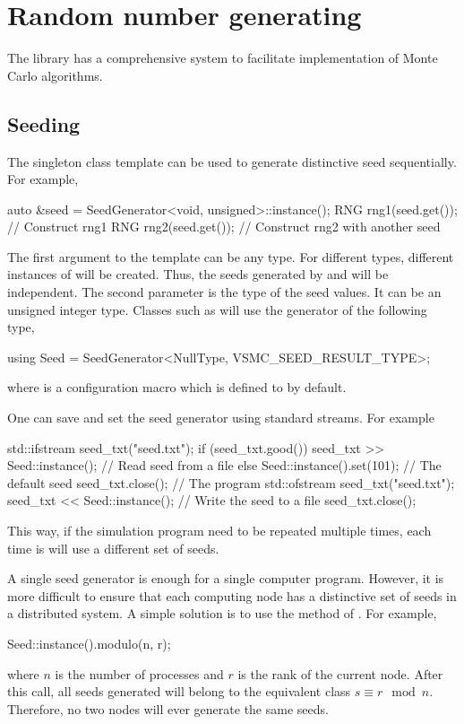 \section{Random number generating}
\label{sec:Random number generating}

The library has a comprehensive \rng system to facilitate implementation of
Monte Carlo algorithms.

\subsection{Seeding}
\label{sub:Seeding}

The singleton class template  can be used to generate
distinctive seed sequentially. For example,
\begin{cppcode}
  auto &seed = SeedGenerator<void, unsigned>::instance();
  RNG rng1(seed.get()); // Construct rng1
  RNG rng2(seed.get()); // Construct rng2 with another seed
\end{cppcode}
The first argument to the template can be any type. For different types,
different instances of  will be created. Thus, the
seeds generated by  and
 will be independent. The second parameter is the
type of the seed values. It can be an unsigned integer type. Classes such as
 will use the generator of the following type,
\begin{cppcode}
  using Seed = SeedGenerator<NullType, VSMC_SEED_RESULT_TYPE>;
\end{cppcode}
where  is a configuration macro which is
defined to  by default.

One can save and set the seed generator using standard \cpp streams. For
example
\begin{cppcode}
  std::ifstream seed_txt("seed.txt");
  if (seed_txt.good())
  seed_txt >> Seed::instance(); // Read seed from a file
  else
  Seed::instance().set(101);    // The default seed
  seed_txt.close();
  // The program
  std::ofstream seed_txt("seed.txt");
  seed_txt << Seed::instance();     // Write the seed to a file
  seed_txt.close();
\end{cppcode}
This way, if the simulation program need to be repeated multiple times, each
time is will use a different set of seeds.

A single seed generator is enough for a single computer program. However, it is
more difficult to ensure that each computing node has a distinctive set of
seeds in a distributed system. A simple solution is to use the
 method of . For example,
\begin{cppcode}
  Seed::instance().modulo(n, r);
\end{cppcode}
where $n$ is the number of processes and $r$ is the rank of the current node.
After this call, all seeds generated will belong to the equivalent class $s
\equiv r\mod{n}$. Therefore, no two nodes will ever generate the same seeds.

